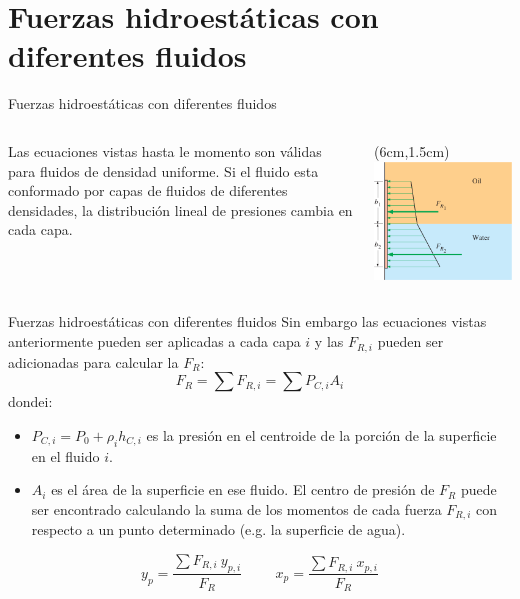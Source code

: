 \documentclass [xcolor=svgnames, t] {beamer}
\begin{document}
\section{Fuerzas hidroest\'aticas con diferentes fluidos}
\begin{frame}{Fuerzas hidroest\'aticas con diferentes fluidos}
\begin{columns}
Las ecuaciones  vistas hasta le momento son v\'alidas para fluidos de densidad uniforme. Si el fluido esta conformado por capas de fluidos de diferentes densidades, la distribuci\'on lineal de presiones cambia en cada capa. 
\begin{textblock*}{6cm}(6cm,1.5cm) %
\includegraphics[width=\textwidth]{mden}
\end{textblock*}
\end{columns}
\end{frame}

\begin{frame}{Fuerzas hidroest\'aticas con diferentes fluidos}
Sin embargo las ecuaciones vistas anteriormente pueden ser aplicadas a cada capa $i$ y las $F_{R,i}$ pueden ser adicionadas para calcular la $F_R$:
$$
F_R = \sum F_{R,i} = \sum P_{C,i}A_i
$$
dondei: 
\begin{itemize}
\item $P_{C,i} =  P_0 + \rho_i h_{C,i}$ es la presi\'on en el centroide de la porci\'on de la superficie en el fluido $i$.
\item $A_i$ es el \'area de la superficie en ese fluido. El centro de presi\'on de $F_R$ puede ser encontrado calculando la suma de los momentos de cada fuerza $F_{R,i}$ con respecto a un punto determinado (e.g. la superficie de agua).
\end{itemize}
$$
y_p = \frac{\sum F_{R,i}\ y_{p,i}}{F_R} \hspace{1cm} x_p = \frac{\sum F_{R,i}\ x_{p,i}}{F_R}
$$
\end{frame}
\end{document}
